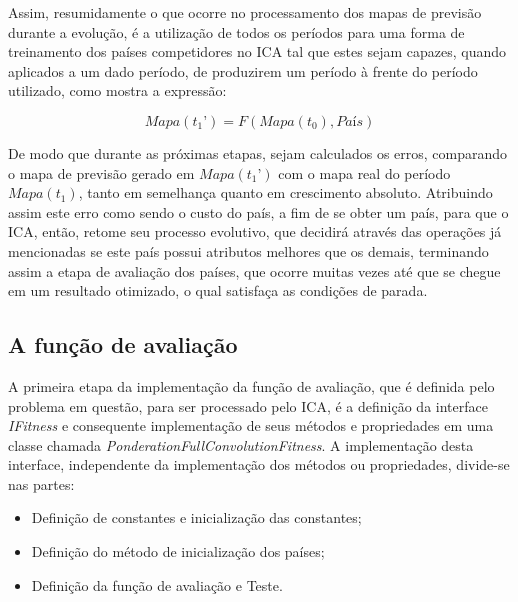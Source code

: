 Assim, resumidamente o que ocorre no processamento dos mapas de previsão durante a evolução, é a utilização de todos os períodos para uma forma de treinamento dos países competidores no ICA tal que estes sejam capazes, quando aplicados a um dado período, de produzirem um período à frente do período utilizado, como mostra a expressão:

\begin{equation}
\label{eq:forecastError}
Mapa(t_1’) = F(Mapa(t_0), País)
\end{equation}

De modo que durante as próximas etapas, sejam calculados os erros, comparando o mapa de previsão gerado em \(Mapa(t_1’)\) com o mapa real do período \(Mapa(t_1)\), tanto em semelhança quanto em crescimento absoluto. Atribuindo assim este erro como sendo o custo do país, a fim de se obter um país, para que o ICA, então, retome seu processo evolutivo, que decidirá através das operações já mencionadas se este país possui atributos melhores que os demais, terminando assim a etapa de avaliação dos países, que ocorre muitas vezes até que se chegue em um resultado otimizado, o qual satisfaça as condições de parada.




\subsection{A função de avaliação}
\label{A função de avaliação}

A primeira etapa da implementação da função de avaliação, que é definida pelo problema em questão, para ser processado pelo ICA, é a definição da interface \emph{IFitness} e consequente implementação de seus métodos e propriedades em uma classe chamada \emph{PonderationFullConvolutionFitness}. A implementação desta interface, independente da implementação dos métodos ou propriedades, divide-se nas partes: 
\begin{itemize}
\item Definição de constantes e inicialização das constantes;
\item Definição do método de inicialização dos países;
\item Definição da função de avaliação e
Teste.
\end{itemize}

